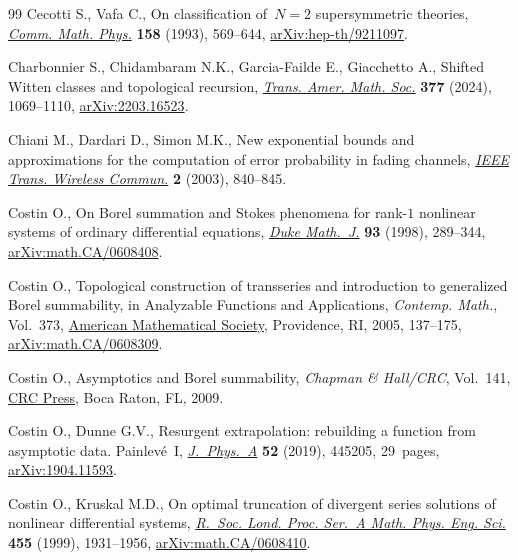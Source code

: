 \begin{thebibliography}{99}
Cecotti S., Vafa C., On classification of~{$N=2$} supersymmetric theories,
 \href{https://doi.org/10.1007/BF02096804}{\textit{Comm. Math. Phys.}}
 \textbf{158} (1993), 569--644,
 \href{http://arxiv.org/abs/hep-th/9211097}{arXiv:hep-th/9211097}.

Charbonnier S., Chidambaram N.K., Garcia-Failde E., Giacchetto A., Shifted
 {W}itten classes and topological recursion,
 \href{https://doi.org/10.1090/tran/9046}{\textit{Trans. Amer. Math. Soc.}}
 \textbf{377} (2024), 1069--1110,
 \href{http://arxiv.org/abs/2203.16523}{arXiv:2203.16523}.

Chiani M., Dardari D., Simon M.K., New exponential bounds and approximations
 for the computation of error probability in fading channels,
 \href{https://doi.org/10.1109/TWC.2003.814350}{\textit{IEEE Trans. Wireless
 Commun.}} \textbf{2} (2003), 840--845.

Costin O., On {B}orel summation and {S}tokes phenomena for rank-{$1$} nonlinear
 systems of ordinary differential equations,
 \href{https://doi.org/10.1215/S0012-7094-98-09311-5}{\textit{Duke Math.~J.}}
 \textbf{93} (1998), 289--344,
 \href{http://arxiv.org/abs/math.CA/0608408}{arXiv:math.CA/0608408}.

Costin O., Topological construction of transseries and introduction to
 generalized {B}orel summability, in Analyzable {F}unctions and
 {A}pplications, \textit{Contemp. Math.}, Vol.~373,
 \href{https://doi.org/10.1090/conm/373/06918}{American Mathematical Society},
 Providence, RI, 2005, 137--175,
 \href{http://arxiv.org/abs/math.CA/0608309}{arXiv:math.CA/0608309}.

Costin O., Asymptotics and {B}orel summability, \textit{Chapman \& Hall/CRC},
 Vol.~141, \href{https://doi.org/10.1201/9781420070323}{CRC Press}, Boca Raton,
 FL, 2009.

Costin O., Dunne G.V., Resurgent extrapolation: rebuilding a function from
 asymptotic data. {P}ainlev\'e~{I},
 \href{https://doi.org/10.1088/1751-8121/ab477b}{\textit{J.~Phys.~A}}
 \textbf{52} (2019), 445205, 29~pages,
 \href{http://arxiv.org/abs/1904.11593}{arXiv:1904.11593}.

Costin O., Kruskal M.D., On optimal truncation of divergent series solutions of
 nonlinear differential systems,
 \href{https://doi.org/10.1098/rspa.1999.0387}{\textit{R.~Soc. Lond. Proc.
 Ser.~A Math. Phys. Eng. Sci.}} \textbf{455} (1999), 1931--1956,
 \href{http://arxiv.org/abs/math.CA/0608410}{arXiv:math.CA/0608410}.


\end{thebibliography}
